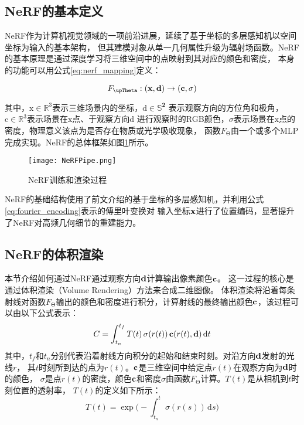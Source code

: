 \subsection{NeRF的基本定义}
NeRF作为计算机视觉领域的一项前沿进展，延续了基于坐标的多层感知机以空间坐标为输入的基本架构，
但其建模对象从单一几何属性升级为辐射场函数。NeRF的基本原理是通过深度学习将三维空间中的点映射到其对应的颜色和密度，
本身的功能可以用公式\eqref{eq:nerf_mapping}定义：

\begin{equation}
  F_{\upTheta}:({\bf{x}}, {\bf{d}})\rightarrow({\bf{c}},\sigma)
  \label{eq:nerf_mapping}
\end{equation}

其中，$\mathrm{x}\in\mathbb{R}^3$表示三维场景内的坐标，$\mathrm{d}\in\mathbb{S}^\mathbf{2}$
表示观察方向的方位角和极角，$\mathrm{c}\in\mathbb{R}^3$表示场景在$\mathrm{x}$点、于观察方向$\mathrm{d}$
进行观察时的RGB颜色，$\sigma$表示场景在$\mathrm{x}$点的密度，物理意义该点为是否存在物质或光学吸收现象，
函数$F_{\upTheta}$由一个或多个MLP完成实现。NeRF的总体框架如图\ref{fig:nerf_pipe}所示。


\begin{figure}[htbp]
  \centering
  \texttt{[image: NeRFPipe.png]}
  \caption{NeRF训练和渲染过程\cite{Mildenhall_2020}}
  \label{fig:nerf_pipe}
\end{figure}

NeRF的基础结构使用了前文介绍的基于坐标的多层感知机，并利用公式\eqref{eq:fourier_encoding}表示的傅里叶变换对
输入坐标$\bf x$进行了位置编码，显著提升了NeRF对高频几何细节的重建能力。

\subsection{NeRF的体积渲染}

本节介绍如何通过NeRF通过观察方向$\bf d$计算输出像素颜色$\bf c$。
这一过程的核心是通过体积渲染（Volume Rendering）方法来合成二维图像。
体积渲染将沿着每条射线对函数$F_{\upTheta}$输出的颜色和密度进行积分，计算射线的最终输出颜色$\bf c$，该过程可以由以下公式表示：
\begin{equation}\label{eq:volume_rendering}
C=\int_{t_n}^{t_f}T(t)\,\sigma(r(t))\,{\bf c}(r(t),{\bf d})\,\mathrm{d}t
\end{equation}
其中，$t_f$和$t_n$分别代表沿着射线方向积分的起始和结束时刻。对沿方向$\bf{d}$发射的光线$r$，
其$t$时刻所到达的点为$r(t)$。$\bf{c}$是三维空间中给定点$r(t)$在观察方向为$\bf{d}$时的颜色，
$\sigma$是点$r(t)$的密度，颜色$\bf c$和密度$\sigma$由函数$F_{\upTheta}$计算。$T(t)$是从相机到$t$时刻位置的透射率，
$T(t)$的定义如下所示：
\begin{equation}\label{eq:transmittance}
T(t)=\exp\Biggl(-\int_{t_n}^{t}\sigma(r(s))\,\mathrm{d}s\Biggr)
\end{equation}


